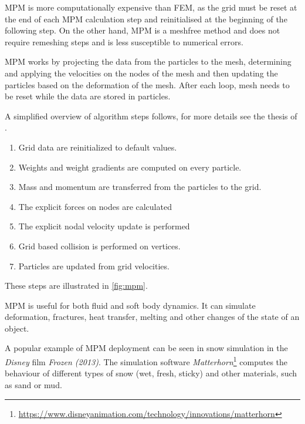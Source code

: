 MPM is more computationally expensive than FEM, as the grid must be reset at the end of each MPM calculation step and reinitialised at the beginning of the following step. On the other hand, MPM is a meshfree method and does not require remeshing steps and is less susceptible to numerical errors. 

MPM works by projecting the data from the particles to the mesh, determining and applying the velocities on the nodes of the mesh and then updating the particles based on the deformation of the mesh. After each loop, mesh needs to be reset while the data are stored in particles.

 A simplified overview of algorithm steps follows, for more details see the thesis of \citet{jiang2015material}.
 
\begin{enumerate}
    \item Grid data are reinitialized to default values.
    \item Weights and weight gradients are computed on every particle.
    \item Mass and momentum are transferred from the particles to the grid.
    \item The explicit forces on nodes are calculated
    \item The explicit nodal velocity update is performed
    \item Grid based collision is performed on vertices.
    \item Particles are updated from grid velocities.
\end{enumerate}
These steps are illustrated in \cref{fig:mpm}.

MPM is useful for both fluid and soft body dynamics. It can simulate deformation, fractures, heat transfer, melting and other changes of the state of an object.

A popular example of MPM deployment can be seen in snow simulation in the \emph{Disney} film \emph{Frozen (2013)}. The simulation software \emph{Matterhorn}\footnote{\url{https://www.disneyanimation.com/technology/innovations/matterhorn}} computes the behaviour of different types of snow (\eg wet, fresh, sticky) and other materials, such as sand or mud.

